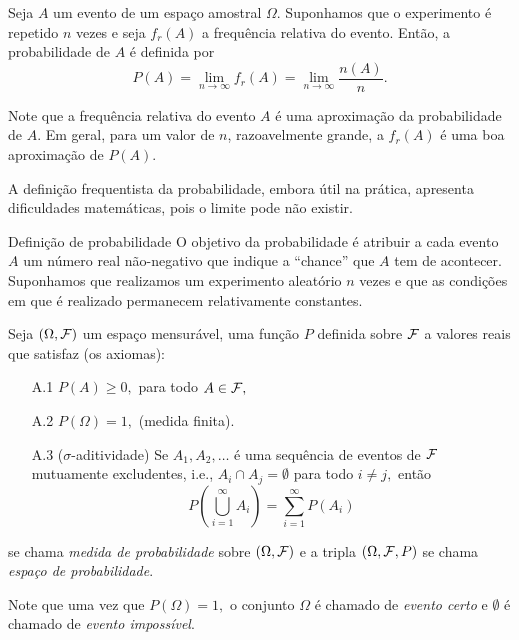 \begin{frame}

 \begin{defi}
Seja $A$ um evento de um espaço amostral $\Omega$. Suponhamos que o experimento  é repetido $n$ vezes e seja $f_r(A)$ a frequência relativa do evento. Então, a probabilidade de $A$ é definida por 
$$
P(A) = \lim_{n \rightarrow \infty} f_r(A) = \lim_{n \rightarrow \infty} \frac{n(A)}{n}.
$$
\end{defi}

Note que a frequência relativa do evento $A$ é uma aproximação da probabilidade de $A$.  Em geral, para um valor de $n$, razoavelmente grande, a $f_r(A)$ é uma boa aproximação de $P(A).$

 \begin{nota}
A definição frequentista da probabilidade, embora útil na prática, apresenta dificuldades matemáticas, pois o limite pode não existir.
\end{nota}

\end{frame}

\begin{frame}{Definição de probabilidade}
O objetivo da probabilidade é atribuir a cada evento $A$ um número real
não-negativo que indique a ``chance'' que $A$ tem de acontecer. Suponhamos que
realizamos um experimento aleatório $n$ vezes e que as condições em que é
realizado permanecem relativamente constantes.

\begin{defi} 
Seja $(\Omega, {\cal F})$ um espaço mensurável, uma função $P$ definida sobre
${\cal F}$ a valores reais que satisfaz (os axiomas):
\begin{enumerate}
 \item[A.1]$P(A)\geq 0,$ para todo $ A\in {\cal F},$
\item[A.2] $P(\Omega)=1,$ (medida finita).
\item[A.3] ($\sigma$-aditividade) Se $A_1, A_2, \ldots$ é uma sequência de eventos de
${\cal F}$  mutuamente excludentes, i.e., $A_i\cap A_j=\emptyset$ para todo
$i\neq j,$ então 
\begin{equation}
\displaystyle
\label{ax3}
P\left(\bigcup_{i=1}^\infty A_i\right)=\sum_{i=1}^\infty P(A_i)
\end{equation}
\end{enumerate}
se chama {\it medida de probabilidade} sobre $(\Omega, {\cal F})$  e a
tripla $(\Omega, {\cal F}, P)$ se chama {\it espaço de probabilidade}.
\end{defi}

Note que  uma vez que $P(\Omega)=1,$ o conjunto $\Omega$ é chamado de {\it evento certo} e $\emptyset$ é chamado de {\it evento impossível}.
\end{frame}

